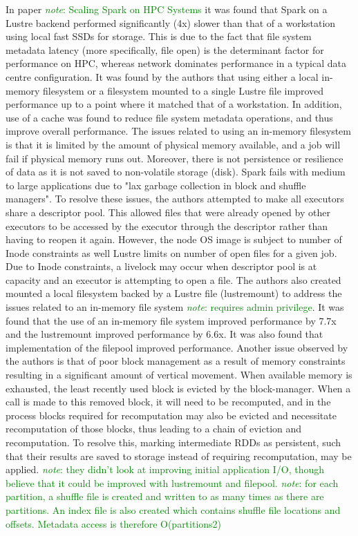 \documentclass{report}
\newcommand{\note}[1]{\textcolor{green}{\textit{note}: #1}}
\begin{document}
    In paper \note{Scaling Spark on HPC Systems} it was found that Spark on a
Lustre backend performed significantly (4x) slower than that of a workstation
using local fast SSDs for storage. This is due to the fact that file system
metadata latency (more specifically, file open) is the determinant factor for
performance on HPC, whereas network dominates performance in a typical data
centre configuration. It was found by the authors that using either a local
in-memory filesystem or a filesystem mounted to a single Lustre file improved
performance up to a point where it matched that of a workstation. In addition,
use of a cache was found to reduce file system metadata operations, and thus
improve overall performance.  The issues related to using an in-memory
filesystem is that it is limited by the amount of physical memory available, and
a job will fail if physical memory runs out. Moreover, there is not persistence
or resilience of data as it is not saved to non-volatile storage (disk). Spark
fails with medium to large applications due to "lax garbage collection in block
and shuffle managers". To resolve these issues, the authors attempted to make
all executors share a descriptor pool. This allowed files that were already
opened by other executors to be accessed by the executor through the descriptor
rather than having to reopen it again. However, the node OS image is subject to
number of Inode constraints as well Lustre limits on number of open files for a
given job. Due to Inode constraints, a livelock may occur when descriptor pool
is at capacity and an executor is attempting to open a file. The authors also
created mounted a local filesystem backed by a Lustre file (lustremount) to
address the issues related to an in-memory file system \note{requires admin
privilege}. It was found that the use of an in-memory file system improved
performance by 7.7x and the lustremount improved performance by 6.6x. It was
also found that implementation of the filepool improved performance.  Another
issue observed by the authors is that of poor block management as a result of
memory constraints resulting in a significant amount of vertical movement. When
available memory is exhausted, the least recently used block is evicted by the
block-manager. When a call is made to this removed block, it will need to be
recomputed, and in the process blocks required for recomputation may also be
evicted and necessitate recomputation of those blocks, thus leading to a chain
of eviction and recomputation. To resolve this, marking intermediate RDDs as
persistent, such that their results are saved to storage instead of requiring
recomputation, may be applied.  \note{they didn't look at improving initial
application I/O, though believe that it could be improved with lustremount and
filepool. } \note{for each partition, a shuffle file is created and written to
as many times as there are partitions. An index file is also created which
contains shuffle file locations and offsets. Metadata access is therefore
O(partitions2)}
	
\end{document}
